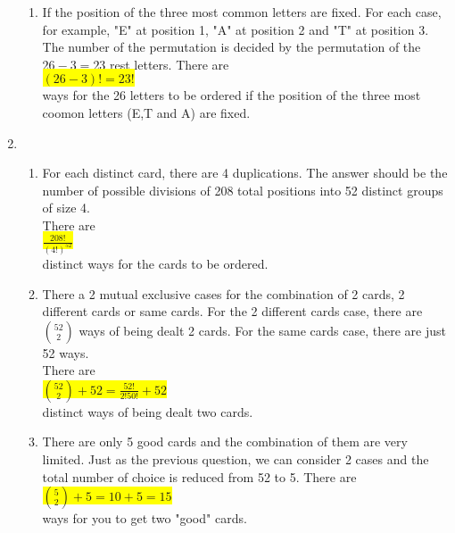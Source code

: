 \documentclass{article}
\begin{document}
\begin{enumerate}
\begin{enumerate}
		\item
		\mysolu
		If the position of the three most common letters are fixed. For each case, for example, "E" at position 1, "A" at position 2 and "T" at position 3. The number of the permutation is decided by the permutation of the ${26 - 3 = 23}$ rest letters.
		\myansw
		There are\\
		\colorbox{yellow}{
			${(26-3)! = 23!}$
		}\\
		ways for the 26 letters to be ordered if the position of the three most coomon letters (E,T and A) are fixed.\\
		
		
	\end{enumerate}

	\item
	\begin{enumerate}
		\item
		\mysolu
		For each distinct card, there are 4 duplications. The answer should be the number of possible divisions of 208 total positions into 52 distinct groups of size 4.\\
		\myansw
		There are\\
		\colorbox{yellow}{
			${\frac{208!}{(4!)^{52}}}$
		}\\
		distinct ways for the cards to be ordered.\\
		
		\item
		\mysolu
		There a 2 mutual exclusive cases for the combination of 2 cards, 2 different cards or same cards. For the 2 different cards case, there are ${{52 \choose 2}}$ ways of being dealt 2 cards. For the same cards case, there are just 52 ways.\\
		\myansw
		There are\\
		\colorbox{yellow}{
			${{52 \choose 2}+52 = \frac{52!}{2!50!}+52}$
		}\\
		distinct ways of being dealt two cards.
		
		\item
		\mysolu
		There are only 5 good cards and the combination of them are very limited. Just as the previous question, we can consider 2 cases and the total number of choice is reduced from 52 to 5.
		\myansw
		There are\\
		\colorbox{yellow}{
			${{5 \choose 2}+5 = 10 + 5 = 15}$
		}\\
		ways for you to get two "good" cards.\\
		

\end{enumerate}
\end{enumerate}
\end{document}
